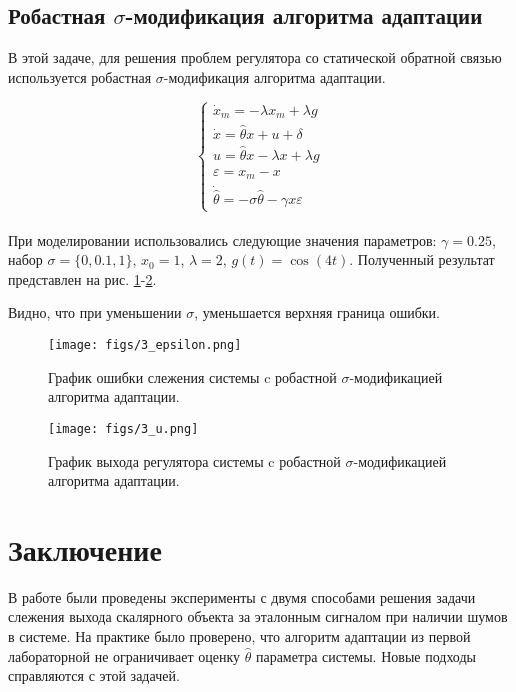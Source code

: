 \documentclass{article}
\begin{document}
\FloatBarrier
\subsection{Робастная $\sigma$-модификация алгоритма адаптации}

В этой задаче, для решения проблем регулятора со статической обратной связью используется робастная $\sigma$-модификация алгоритма адаптации.

\[
\begin{cases}
    \dot x_m = -\lambda x_m + \lambda g    \\
    \dot x = \hat \theta x + u + \delta\\
    u = \hat \theta x - \lambda x + \lambda g \\
    \varepsilon = x_m - x \\ 
    \dot{\hat \theta} =-\sigma\hat\theta -\gamma x \varepsilon
\end{cases}
\] \\

При моделировании использовались следующие значения параметров: $\gamma = 0.25$, набор $\sigma = \{0, 0.1, 1\}$, $x_0 = 1$, $\lambda = 2$, $g(t) = \cos(4t)$. Полученный результат представлен на рис. \ref{fig:3_epsilon}-\ref{fig:3_u}.

Видно, что при уменьшении $\sigma$, уменьшается верхняя граница ошибки.

\begin{figure}[h!]
  \centering
  \texttt{[image: figs/3\_epsilon.png]}
  \caption{График ошибки слежения системы c робастной $\sigma$-модификацией алгоритма адаптации.} 
  \label{fig:3_epsilon}
\end{figure}

\begin{figure}[h!]
  \centering
  \texttt{[image: figs/3\_u.png]}
  \caption{График выхода регулятора системы c робастной $\sigma$-модификацией алгоритма адаптации.} 
  \label{fig:3_u}
\end{figure}

\FloatBarrier
\newpage
\section{Заключение}
В работе были проведены эксперименты с двумя способами решения задачи слежения выхода скалярного объекта за эталонным сигналом при наличии шумов в системе.
На практике было проверено, что алгоритм адаптации из первой лабораторной не ограничивает оценку \(\hat \theta\) параметра системы. Новые подходы справляются с этой задачей. 
\end{document}
